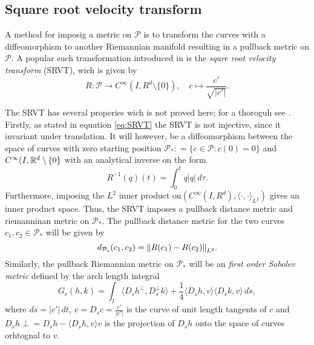 \subsection{Square root velocity transform}
A method for imposig a metric on \(\mathcal{P}\) is to transform the curves with a diffeomorphism to another Riemannian manifold resulting in a pullback metric on \(\mathcal{P}\). A popular such transformation introduced in \cite{srivastava2011_srvt} is the \emph{sqare root velocity transform} (SRVT), wich is given by 
\begin{equation}\label{eq:SRVT}
  R :\mathcal{P} \rightarrow C^{\infty}(I, R^d \setminus \{0\}), \quad c \mapsto \frac{c'}{\sqrt{\vert c' \vert}}.
\end{equation} 

The SRVT has several properies wich is not proved here; for a thoroguh  see \cite{bruveris1016_srvtexample,bauer2014_rprop}. Firstly, as stated in equation \eqref{eq:SRVT} the SRVT is not injective, since it invariant under translation. It will however, be a diffeomorphism between the space of curves with zero starting position \(\mathcal{P}_* : = \{c \in \mathcal{P}: c(0) = 0\} \) and \(C^{\infty}(I, \mathbb{R}^d \setminus \{0\}\) with an analytical inverse on the form 
\begin{equation}
  R^{-1}(q)(t) = \int_0 ^t q \vert q\vert \,d\tau.
\end{equation}
Furthermore, imposing the \(L^2\) inner product on\((C^{\infty}(I, R^d), \langle \cdot , \cdot \rangle_{L^2} )\) gives an inner product space. Thus, the SRVT imposes a pullback distance metric and riemanninan metric on \(\mathcal{P}_*\). The pullback distance metric for the two curves \(c_1, c_2 \in \mathcal{P}_*\) will be given by
\begin{equation}\label{eq:sob_pullback_dist}
  d_{\mathcal{P}_*}(c_1, c_2) = \norm{R(c_1) - R(c_2)}_{L^2}.
\end{equation}
Similarly, the pullback Riemannian metric on \(\mathcal{P}_*\) will be an \emph{first order Sobolev metric} defined by the arch length integral
\begin{equation}
  G_c(h,k) = \int_I \langle D_s h^\perp ,D_s^\perp k \rangle+\frac{1}{4}\langle D_s h,v\rangle \langle D_s k,v\rangle \,ds,
\end{equation}
where \(ds = \vert c' \vert\,dt\), \(v = D_s c = \frac{c'}{\vert c'\vert}\) is the curve of unit length tangents of \(c\) and \(D_s h \perp = D_s h  - \langle D_s h,v\rangle v\) is the projection of \(D_s h\) onto the space of curves orhtognal to \(v\). 

